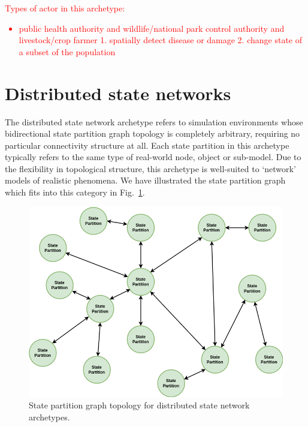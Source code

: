 \textcolor{red}{Types of actor in this archetype:
\begin{itemize}
\item{public health authority and wildlife/national park control authority and livestock/crop farmer 1. spatially detect disease or damage 2. change state of a subset of the population}
\end{itemize}}

\section{\sffamily Distributed state networks}

The distributed state network archetype refers to simulation environments whose bidirectional state partition graph topology is completely arbitrary, requiring no particular connectivity structure at all. Each state partition in this archetype typically refers to the same type of real-world node, object or sub-model. Due to the flexibility in topological structure, this archetype is well-suited to `network' models of realistic phenomena. We have illustrated the state partition graph which fits into this category in Fig.~\ref{fig:state-partition-graph-distributed-state-networks}.

\begin{figure}[h]
\centering
\includegraphics[width=12cm]{images/chapter-8-state-partition-graph.drawio.png}
\caption{State partition graph topology for distributed state network archetypes.}
\label{fig:state-partition-graph-distributed-state-networks}
\end{figure}

